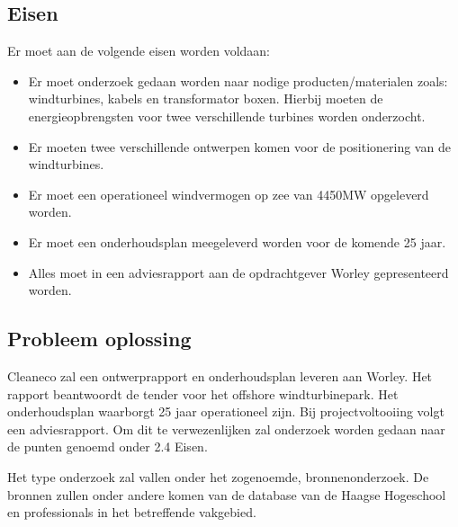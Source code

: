 \subsection{Eisen}
Er moet aan de volgende eisen worden voldaan:
\begin{itemize}
   \item Er moet onderzoek gedaan worden naar nodige producten/materialen zoals: windturbines, kabels en transformator boxen. Hierbij moeten de energieopbrengsten voor twee verschillende turbines worden onderzocht.
   \item Er moeten twee verschillende ontwerpen komen voor de positionering van de windturbines. 
   \item Er moet een operationeel windvermogen op zee van 4450MW opgeleverd worden.
   \item Er moet een onderhoudsplan meegeleverd worden voor de komende 25 jaar.
   \item Alles moet in een adviesrapport aan de opdrachtgever Worley gepresenteerd worden. 
 \end{itemize}

\subsection{Probleem oplossing}
Cleaneco zal een ontwerprapport en onderhoudsplan leveren aan Worley. Het rapport beantwoordt de tender voor het \gls{offshore} windturbinepark. Het onderhoudsplan waarborgt 25 jaar operationeel zijn. Bij projectvoltooiing volgt een adviesrapport. Om dit te verwezenlijken zal onderzoek worden gedaan naar de punten genoemd onder 2.4 Eisen. 

Het type onderzoek zal vallen onder het zogenoemde, bronnenonderzoek. De bronnen zullen onder andere komen van de database van de Haagse Hogeschool en professionals in het betreffende vakgebied.
